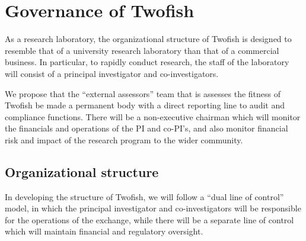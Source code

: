 \section{Governance of Twofish}

As a research laboratory, the organizational structure of Twofish is
designed to resemble that of a university research laboratory than that
of a commercial business.  In particular, to rapidly conduct
research, the staff of the laboratory will consist of a principal
investigator and co-investigators.

We propose that the ``external assessors'' team that is assesses the
fitness of Twofish be made a permanent body with a direct reporting
line to audit and compliance functions.  There will be a non-executive
chairman which will monitor the financials and operations of the PI
and co-PI's, and also monitor financial risk and impact of the
research program to the wider community.

\subsection{Organizational structure}
In developing the structure of Twofish, we will follow a ``dual line
of control'' model, in which the principal investigator and
co-investigators will be responsible for the operations of the
exchange, while there will be a separate line of control which will
maintain financial and regulatory oversight.

